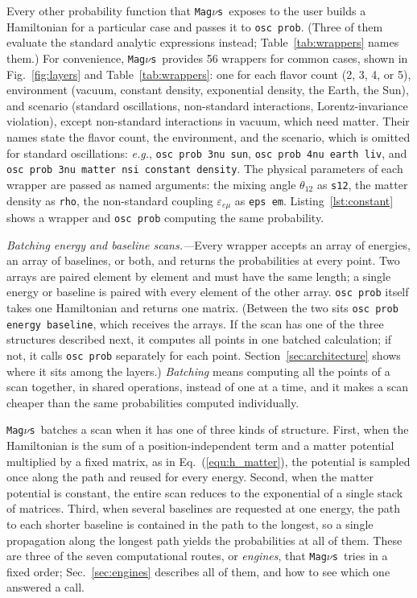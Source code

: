 \documentclass[final,5p,times,twocolumn,sort,compress]{elsarticle}
\makeatletter
\newcommand{\eg}{{\it e.g.}}
\newcommand{\eq}{Eq.}
\newcommand{\fig}{Fig.}
\DeclareRobustCommand{\_}{%
  \ifmmode\nfss@text{\textunderscore}\else\textunderscore\allowbreak\fi}
\newcommand{\Tab}{Table}
\newcommand{\equ}[1]{\eq~(\ref{equ:#1})}
\newcommand{\figu}[1]{\fig~\ref{fig:#1}}
\newcommand{\tabl}[1]{\Tab~\ref{tab:#1}}
\newcommand{\magnus}{{\tt Mag}\ensuremath{\nu}{\tt s}}
\makeatother
\begin{document}
Every other probability function that \magnus\ exposes to the user builds a Hamiltonian for a particular case and passes it to {\tt osc\_prob}. (Three of them evaluate the standard analytic expressions instead; \tabl{wrappers} names them.) For convenience, \magnus\ provides 56 wrappers for common cases, shown in \figu{layers} and \tabl{wrappers}: one for each flavor count (2, 3, 4, or 5), environment (vacuum, constant density, exponential density, the Earth, the Sun), and scenario (standard oscillations, non-standard interactions, Lorentz-invariance violation), except non-standard interactions in vacuum, which need matter. Their names state the flavor count, the environment, and the scenario, which is omitted for standard oscillations: \eg, {\tt osc\_prob\_3nu\_sun}, {\tt osc\_prob\_4nu\_earth\_liv}, and {\tt osc\_prob\_3nu\_matter\_nsi\_constant\_density}. The physical parameters of each wrapper are passed as named arguments: the mixing angle $\theta_{12}$ as {\tt s12}, the matter density as {\tt rho}, the non-standard coupling $\varepsilon_{e\mu}$ as {\tt eps\_em}. Listing~\ref{lst:constant} shows a wrapper and {\tt osc\_prob} computing the same probability.

\smallskip

\textit{Batching energy and baseline scans.---}Every wrapper accepts an array of energies, an array of baselines, or both, and returns the probabilities at every point. Two arrays are paired element by element and must have the same length; a single energy or baseline is paired with every element of the other array. {\tt osc\_prob} itself takes one Hamiltonian and returns one matrix. (Between the two sits {\tt osc\_prob\_energy\_baseline}, which receives the arrays. If the scan has one of the three structures described next, it computes all points in one batched calculation; if not, it calls {\tt osc\_prob} separately for each point. Section~\ref{sec:architecture} shows where it sits among the layers.) \emph{Batching} means computing all the points of a scan together, in shared operations, instead of one at a time, and it makes a scan cheaper than the same probabilities computed individually. 

\magnus\ batches a scan when it has one of three kinds of structure. First, when the Hamiltonian is the sum of a position-independent term and a matter potential multiplied by a fixed matrix, as in \equ{h_matter}, the potential is sampled once along the path and reused for every energy. Second, when the matter potential is constant, the entire scan reduces to the exponential of a single stack of matrices. Third, when several baselines are requested at one energy, the path to each shorter baseline is contained in the path to the longest, so a single propagation along the longest path yields the probabilities at all of them. These are three of the seven computational routes, or \emph{engines}, that \magnus\ tries in a fixed order; Sec.~\ref{sec:engines} describes all of them, and how to see which one answered a call.
\end{document}
